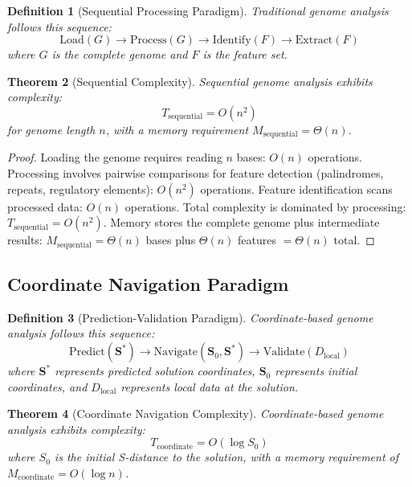 \documentclass[11pt,a4paper]{article}
\newtheorem{theorem}{Theorem}[section]
\newtheorem{definition}[theorem]{Definition}
\theoremstyle{remark}
\newcommand{\Scoord}{\mathbf{S}}
\begin{document}
\begin{definition}[Sequential Processing Paradigm]
\label{def:sequential_paradigm}
Traditional genome analysis follows this sequence:
\begin{equation}
\text{Load}(G) \to \text{Process}(G) \to \text{Identify}(F) \to \text{Extract}(F)
\end{equation}
where $G$ is the complete genome and $F$ is the feature set.
\end{definition}

\begin{theorem}[Sequential Complexity]
\label{thm:sequential_complexity}
Sequential genome analysis exhibits complexity:
\begin{equation}
T_{\text{sequential}} = O(n^2)
\end{equation}
for genome length $n$, with a memory requirement $M_{\text{sequential}} = \Theta(n)$.
\end{theorem}

\begin{proof}
Loading the genome requires reading $n$ bases: $O(n)$ operations. Processing involves pairwise comparisons for feature detection (palindromes, repeats, regulatory elements): $O(n^2)$ operations. Feature identification scans processed data: $O(n)$ operations. Total complexity is dominated by processing: $T_{\text{sequential}} = O(n^2)$. Memory stores the complete genome plus intermediate results: $M_{\text{sequential}} = \Theta(n)$ bases plus $\Theta(n)$ features $= \Theta(n)$ total.
\end{proof}

\subsection{Coordinate Navigation Paradigm}

\begin{definition}[Prediction-Validation Paradigm]
\label{def:prediction_validation}
Coordinate-based genome analysis follows this sequence:
\begin{equation}
\text{Predict}(\Scoord^*) \to \text{Navigate}(\Scoord_0, \Scoord^*) \to \text{Validate}(D_{\text{local}})
\end{equation}
where $\Scoord^*$ represents predicted solution coordinates, $\Scoord_0$ represents initial coordinates, and $D_{\text{local}}$ represents local data at the solution.
\end{definition}

\begin{theorem}[Coordinate Navigation Complexity]
\label{thm:coordinate_complexity}
Coordinate-based genome analysis exhibits complexity:
\begin{equation}
T_{\text{coordinate}} = O(\log S_0)
\end{equation}
where $S_0$ is the initial S-distance to the solution, with a memory requirement of $M_{\text{coordinate}} = O(\log n)$.
\end{theorem}
\end{document}
